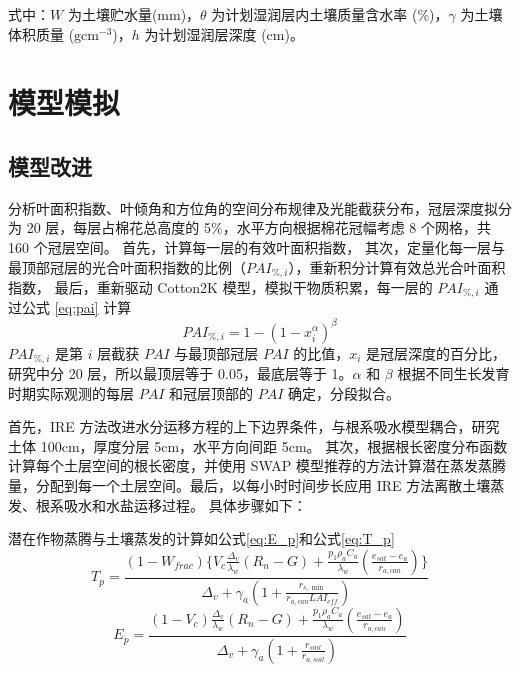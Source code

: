 式中：$W$ 为土壤贮水量(mm)，$\theta$ 为计划湿润层内土壤质量含水率 (\%)，$\gamma$ 为土壤体积质量 ($\mathrm{g cm^{-3}}$)，$h$ 为计划湿润层深度 (cm)。

\section{模型模拟}
\subsection{模型改进}

分析叶面积指数、叶倾角和方位角的空间分布规律及光能截获分布，冠层深度拟分为 20 层，每层占棉花总高度的 5\%，水平方向根据棉花冠幅考虑 8 个网格，共 160 个冠层空间。
首先，计算每一层的有效叶面积指数，
其次，定量化每一层与最顶部冠层的光合叶面积指数的比例（$PAI_{\%,i}$），重新积分计算有效总光合叶面积指数，
最后，重新驱动 Cotton2K 模型，模拟干物质积累，每一层的 $PAI_{\%,i}$ 通过公式 \ref{eq:pai} 计算
\begin{equation}
    \label{eq:pai}
    PAI_{\%,i} = 1 - (1 - x_i^\alpha)^\beta
\end{equation}
$PAI_{\%,i}$ 是第 $i$ 层截获 $PAI$ 与最顶部冠层 $PAI$ 的比值，$x_i$ 是冠层深度的百分比，
研究中分 20 层，所以最顶层等于 0.05，最底层等于 1。$\alpha$ 和 $\beta$ 根据不同生长发育时期实际观测的每层 $PAI$ 和冠层顶部的 $PAI$ 确定，分段拟合。

首先，IRE 方法改进水分运移方程的上下边界条件，与根系吸水模型耦合，研究土体 100cm，厚度分层 5cm，水平方向间距 5cm。
其次，根据根长密度分布函数计算每个土层空间的根长密度，并使用 SWAP 模型推荐的方法计算潜在蒸发蒸腾量，分配到每一个土层空间。最后，以每小时时间步长应用 IRE 方法离散土壤蒸发、根系吸水和水盐运移过程。
具体步骤如下：


潜在作物蒸腾与土壤蒸发的计算如公式\ref{eq:E_p}和公式\ref{eq:T_p}
\begin{equation}
    \label{eq:T_p}
    T_p = \frac{
        (1 - W_{frac}) \{ V_c \frac{\Delta_v}{\lambda_w} (R_n - G) + \frac{p_1 \rho_a C_a}{\lambda_w} (\frac{e_{sat} - e_a}{r_{a,can}}) \}
    }{
        \Delta_v + \gamma_a(1 + \frac{ r_{s,\min} }{ r_{a,can} LAI_{eff} })
    }
\end{equation}
\begin{equation}
    \label{eq:E_p}
    E_p = \frac{
        (1 - V_c) \frac{\Delta_v}{\lambda_w} (R_n - G)
        + \frac{p_1 \rho_a C_a}{\lambda_w} (\frac{e_{sat} - e_a}{r_{a,can}})
    }{
        \Delta_v + \gamma_a (1 + \frac{r_{soil}}{r_{a,soil}})
    }
\end{equation}

